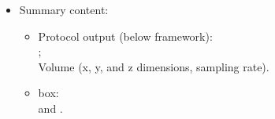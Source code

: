 \begin{itemize}
 \item Summary content:
  \begin{itemize}
     \item Protocol output (below \scipion framework):\\ ;\\ Volume (x, y, and z dimensions, sampling rate).
     \item {} box:\\  and .
    \end{itemize}
    
\end{itemize}
